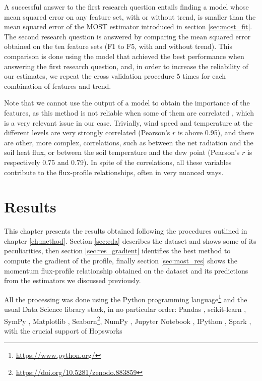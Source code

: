 \documentclass[a4paper]{book}
\begin{document}
A successful answer to the first research question entails finding a model whose mean squared error on any feature set, with or without trend, is smaller than the mean squared error of the MOST estimator introduced in section \ref{sec:most_fit}. The second research question is answered by comparing the mean squared error obtained on the ten feature sets (F1 to F5, with and without trend). This comparison is done using the model that achieved the best performance when answering the first research question, and, in order to increase the reliability of our estimates, we repeat the cross validation procedure 5 times for each combination of features and trend.

Note that we cannot use the output of a model to obtain the importance of the features, as this method is not reliable when some of them are correlated \citep{rf_bias,rf_corr_imp}, which is a very relevant issue in our case. Trivially, wind speed and temperature at the different levels are very strongly correlated (Pearson's $r$ is above 0.95), and there are other, more complex, correlations, such as between the net radiation and the soil heat flux, or between the soil temperature and the dew point (Pearson's $r$ is respectively 0.75 and 0.79). In spite of the correlations, all these variables contribute to the flux-profile relationships, often in very nuanced ways.

\chapter{Results}
\label{ch:results}

This chapter presents the results obtained following the procedures outlined in chapter \ref{ch:method}. Section \ref{sec:eda} describes the dataset and shows some of its peculiarities, then section \ref{sec:res_gradient} identifies the best method to compute the gradient of the profile, finally section \ref{sec:most_res} shows the momentum flux-profile relationship obtained on the dataset and its predictions from the estimators we discussed previously.

All the processing was done using the Python programming language\footnote{\url{https://www.python.org/}} and the usual Data Science library stack, in no particular order: Pandas \citep{pandas}, scikit-learn \citep{sklearn}, SymPy \citep{sympy}, Matplotlib \citep{matplotlib}, Seaborn\footnote{\url{https://doi.org/10.5281/zenodo.883859}}, NumPy \citep{numpy}, Jupyter Notebook \citep{jupyter}, IPython \citep{ipython}, Spark \citep{spark}, with the crucial support of Hopsworks \citep{hops}
\end{document}
